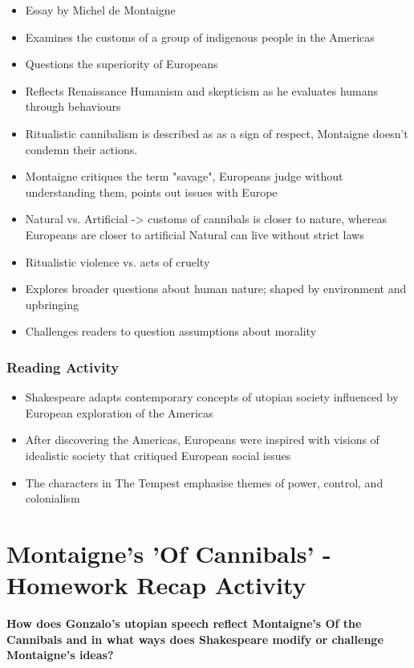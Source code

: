 			\begin{itemize}
				\item Essay by Michel de Montaigne
				\item Examines the customs of a group of indigenous people in the Americas
				\item Questions the superiority of Europeans
				\item Reflects Renaissance Humanism and skepticism as he evaluates humans through behaviours
				\item Ritualistic cannibalism is described as as a sign of respect, Montaigne doesn't condemn their actions.
				\item Montaigne critiques the term "savage", Europeans judge without understanding them, points out issues with Europe
				\item Natural vs. Artificial -> customs of cannibals is closer to nature, whereas Europeans are closer to artificial
					\subitem Natural can live without strict laws
				\item Ritualistic violence vs. acts of cruelty
				\item Explores broader questions about human nature; shaped by environment and upbringing
				\item Challenges readers to question assumptions about morality
			\end{itemize}

		\subsubsection{Reading Activity}
		
			\begin{itemize}
				\item Shakespeare adapts contemporary concepts of utopian society influenced by European exploration of the Americas
				\item After discovering the Americas, Europeans were inspired with visions of idealistic society that critiqued European social issues
				\item The characters in The Tempest emphasise themes of power, control, and colonialism
			\end{itemize}

\section{Montaigne's 'Of Cannibals' - Homework Recap Activity} \label{25/02/2025}

	\textbf{How does Gonzalo’s utopian speech reflect Montaigne’s Of the Cannibals and in what ways does Shakespeare modify or challenge Montaigne’s ideas?}

